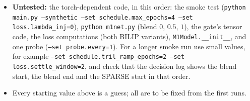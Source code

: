 \begin{itemize}[leftmargin=1.5em]
\item \textbf{Untested:} the torch-dependent code, in this order: the smoke test
      (\texttt{python main.py --synthetic --set schedule.max\_epochs=4 --set
      loss.lambda\_inj=0}), \texttt{python m1net.py} (blend $0$, $0.5$, $1$), the
      gate's tensor code, the loss computations (both BILIP variants), 
      \texttt{M1Model.\_\_init\_\_}, and
      one probe (\texttt{--set probe.every=1}). For a longer smoke run use small
      values, for example \texttt{--set schedule.tril\_ramp\_epochs=2 --set
      loss.settle\_window=2}, and check that the decision log shows the blend start,
      the blend end and the SPARSE start in that order.
\item Every starting value above is a guess; all are to be fixed from the first runs.
\end{itemize}
